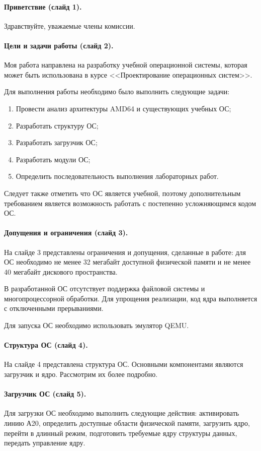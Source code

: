 \documentclass[12pt]{article}
\begin{document}
\paragraph{Приветствие (слайд 1).}
Здравствуйте, уважаемые члены комиссии.

\paragraph{Цели и задачи работы (слайд 2).}
Моя работа направлена на разработку учебной операционной системы, которая может
быть использована в курсе <<Проектирование операционных систем>>.

Для выполнения работы необходимо было выполнить следующие задачи:
\begin{enumerate}
\item Провести анализ архитектуры AMD64 и существующих учебных ОС;
\item Разработать структуру ОС;
\item Разработать загрузчик ОС;
\item Разработать модули ОС;
\item Определить последовательность выполнения лабораторных работ.
\end{enumerate}

Следует также отметить что ОС является учебной, поэтому дополнительным требованием
является возможность работать с постепенно усложняющимся кодом ОС.

\paragraph{Допущения и ограничения (слайд 3).}
На слайде 3 представлены ограничения и допущения, сделанные в работе: для ОС необходимо
не менее 32 мегабайт доступной физической памяти и не менее 40 мегабайт дискового пространства.

В разработанной ОС отсутствует поддержка файловой системы и многопроцессорной обработки.
Для упрощения реализации, код ядра выполняется с отключенными прерываниями.

Для запуска ОС необходимо использовать эмулятор QEMU.

\paragraph{Структура ОС (слайд 4).}
На слайде 4 представлена структура ОС. Основными компонентами являются загрузчик и ядро.
Рассмотрим их более подробно.

\paragraph{Загрузчик ОС (слайд 5).}
Для загрузки ОС необходимо выполнить следующие действия: активировать линию А20,
определить доступные области физической памяти, загрузить ядро, перейти в длинный
режим, подготовить требуемые ядру структуры данных, передать управление ядру.
\end{document}
